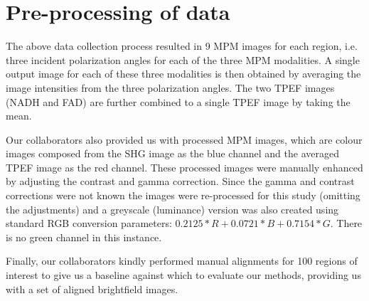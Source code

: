 \documentclass{report}
\begin{document}
\section{Pre-processing of data}
The above data collection process resulted in 9 MPM images for each region, i.e. three incident polarization angles for each of the three MPM modalities. A single output image for each of these three modalities is then obtained by averaging the image intensities from the three polarization angles. The two TPEF images (NADH and FAD) are further combined to a single TPEF image by taking the mean.

Our collaborators also provided us with processed MPM images, which are colour images composed from the SHG image as the blue channel and the averaged TPEF image as the red channel. These processed images were manually enhanced by adjusting the contrast and gamma correction. Since the gamma and contrast corrections were not known the images were re-processed for this study (omitting the adjustments) and a greyscale (luminance) version was also created using standard RGB conversion parameters: $0.2125*R + 0.0721*B + 0.7154*G$. There is no green channel in this instance.

Finally, our collaborators kindly performed manual alignments for 100 regions of interest to give us a baseline against which to evaluate our methods, providing us with a set of aligned brightfield images. 
\end{document}
